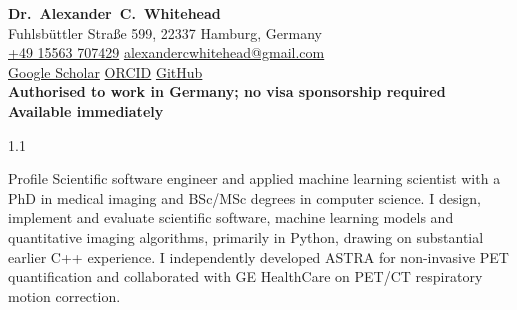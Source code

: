 \documentclass{cv}
\begin{document}
    \setlength{\parindent}{0pt}

    {\LARGE\textbf{Dr.~Alexander~C.~Whitehead}}\\
    {\small
    Fuhlsbüttler Straße 599, 22337 Hamburg, Germany\\
    \href{tel:+4915563707429}{+49 15563 707429} \textbar{} \href{mailto:alexandercwhitehead@gmail.com}{alexandercwhitehead@gmail.com}\\
    \href{https://scholar.google.com/citations?user=-hH_J28AAAAJ}{Google Scholar}
    \textbar{}
    \href{https://orcid.org/0000-0002-9151-3295}{ORCID}
    \textbar{}
    \href{https://github.com/ALEXJAZZ008008}{GitHub}\\
    \textbf{Authorised to work in Germany; no visa sponsorship required \textbar{} Available immediately}}
    
    \begin{spacing}{1.1}
        \normalsize
        
        \vspace{0.35cm}
        \begin{rSection}{Profile}
            Scientific software engineer and applied machine learning scientist with a PhD in medical imaging and BSc/MSc degrees in computer science. I design, implement and evaluate scientific software, machine learning models and quantitative imaging algorithms, primarily in Python, drawing on substantial earlier C++ experience. I independently developed ASTRA for non-invasive PET quantification and collaborated with GE HealthCare on PET/CT respiratory motion correction.
        \end{rSection}
        

\end{spacing}
\end{document}
